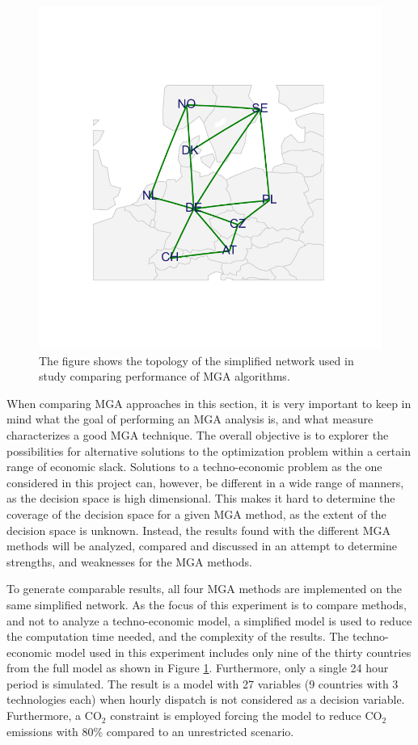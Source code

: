 \begin{figure}[h]\centering
	\includegraphics[width=.7\textwidth,trim={0 2.8cm 0 3cm},clip]{./Images/comparison_topology}
	\caption{The figure shows the topology of the simplified network used in study comparing performance of MGA algorithms. }
	\label{fig:comparison_topology}
\end{figure}


When comparing MGA approaches in this section, it is very important to keep in mind what the goal of performing an MGA analysis is, and what measure characterizes a good MGA technique. The overall objective is to explorer the possibilities for alternative solutions to the optimization problem within a certain range of economic slack. Solutions to a techno-economic problem as the one considered in this project can, however, be different in a wide range of manners, as the decision space is high dimensional. This makes it hard to determine the coverage of the decision space for a given MGA method, as the extent of the decision space is unknown. Instead, the results found with the different MGA methods will be analyzed, compared and discussed in an attempt to determine strengths, and weaknesses for the MGA methods. 

To generate comparable results, all four MGA methods are implemented on the same simplified network. As the focus of this experiment is to compare methods, and not to analyze a techno-economic model, a simplified model is used to reduce the computation time needed, and the complexity of the results. The techno-economic model used in this experiment includes only nine of the thirty countries from the full model as shown in Figure \ref{fig:comparison_topology}. Furthermore, only a single 24 hour period is simulated. The result is a model with 27 variables (9 countries with 3 technologies each) when hourly dispatch is not considered as a decision variable. Furthermore, a $\text{CO}_2$ constraint is employed forcing the model to reduce $\text{CO}_2$ emissions with 80\% compared to an unrestricted scenario. 

